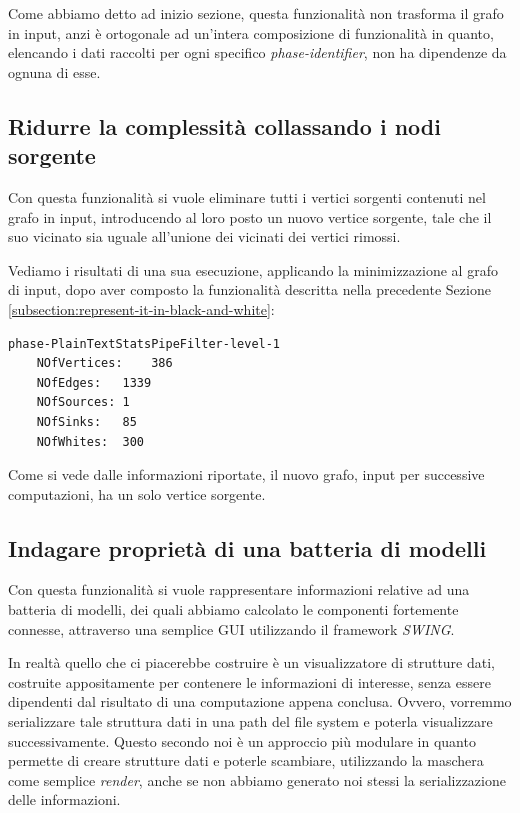 Come abbiamo detto ad inizio sezione, questa funzionalit\`a non
trasforma il grafo in input, anzi \`e ortogonale ad un'intera
composizione di funzionalit\`a in quanto, elencando i dati raccolti
per ogni specifico \emph{phase-identifier}, non ha dipendenze da
ognuna di esse.

\subsection{Ridurre la complessit\`a collassando i nodi sorgente}
Con questa funzionalit\`a si vuole eliminare tutti i vertici sorgenti
contenuti nel grafo in input, introducendo al loro posto un nuovo
vertice sorgente, tale che il suo vicinato sia uguale all'unione dei
vicinati dei vertici rimossi.

Vediamo i risultati di una sua esecuzione, applicando la
minimizzazione al grafo di input, dopo aver composto la funzionalit\`a
descritta nella precedente Sezione
\ref{subsection:represent-it-in-black-and-white}:
\begin{lstlisting}
phase-PlainTextStatsPipeFilter-level-1
	NOfVertices:	386
	NOfEdges:	1339
	NOfSources:	1
	NOfSinks:	85
	NOfWhites:	300
\end{lstlisting}
Come si vede dalle informazioni riportate, il nuovo grafo, input per
successive computazioni, ha un solo vertice sorgente.

\subsection{Indagare propriet\`a di una batteria di modelli}
\label{subsection:use-case-result-viewer}
Con questa funzionalit\`a si vuole rappresentare informazioni relative
ad una batteria di modelli, dei quali abbiamo calcolato le componenti
fortemente connesse, attraverso una semplice GUI utilizzando il
framework \emph{SWING}.

In realt\`a quello che ci piacerebbe costruire \`e un visualizzatore
di strutture dati, costruite appositamente per contenere le
informazioni di interesse, senza essere dipendenti dal risultato di
una computazione appena conclusa. Ovvero, vorremmo serializzare tale
struttura dati in una path del file system e poterla visualizzare
successivamente. Questo secondo noi \`e un approccio pi\`u modulare in
quanto permette di creare strutture dati e poterle scambiare,
utilizzando la maschera come semplice \emph{render}, anche se non
abbiamo generato noi stessi la serializzazione delle informazioni.

